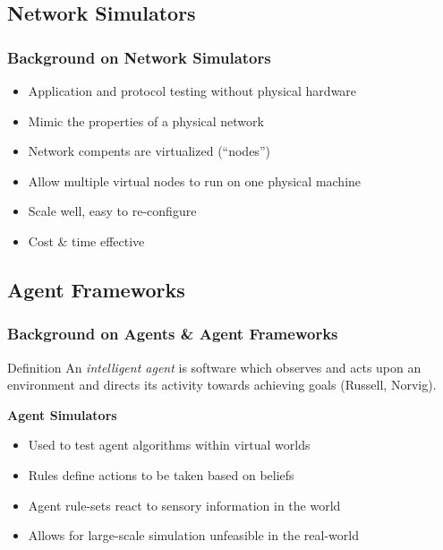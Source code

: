 \documentclass[mathserif,usenames,dvipsnames]{beamer}
\begin{document}
\subsection{Network Simulators}
\frame
{
    \frametitle{Background on Network Simulators}
    \begin{itemize}
        \item Application and protocol testing without physical hardware
        \item Mimic the properties of a physical network
        \item Network compents are virtualized (``nodes'') 
        \item Allow multiple virtual nodes to run on one physical machine
        \item Scale well, easy to re-configure
        \item Cost \& time effective
    \end{itemize}
}

\subsection{Agent Frameworks}
\frame
{
    \frametitle{Background on Agents \& Agent Frameworks}
    \begin{block}{Definition}
    An \emph{intelligent agent} is software which observes and acts upon an environment and directs its activity towards achieving goals (Russell, Norvig).
    \end{block}

    \textbf{Agent Simulators}
    \begin{itemize}
        \item Used to test agent algorithms within virtual worlds
        \item Rules define actions to be taken based on beliefs
        \item Agent rule-sets react to sensory information in the world
        \item Allows for large-scale simulation unfeasible in the real-world
    \end{itemize}
}
\end{document}
